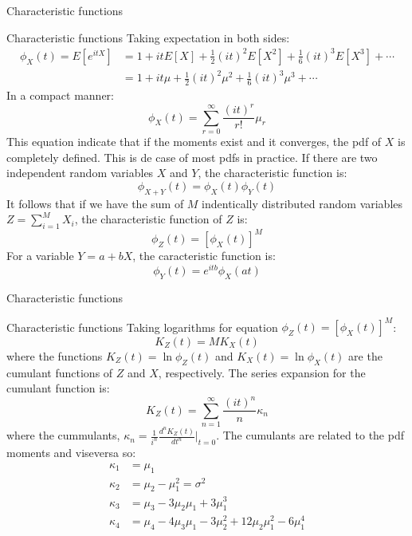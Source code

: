 \documentclass[8pt]{beamer}
\renewcommand{\emph}[1]{\textcolor{myorange}{#1}}
\begin{document}
\begin{frame}{Characteristic functions}
    \begin{block}{Characteristic functions}
        Taking expectation in both sides:
        \begin{align*}
            \phi_X (t) = E[e^{itX}] &= 1 + itE[X] + \frac{1}{2} (it)^2 E[X^2] + \frac{1}{6} (it)^3 E[X^3] + \cdots  \\
                                    &= 1 + it\mu + \frac{1}{2} (it)^2 \mu^2 + \frac{1}{6} (it)^3 \mu^3 + \cdots  
        \end{align*}
    In a compact manner:
    \[
        \phi_X (t) = \sum_{r=0}^{\infty} \frac{(it)^r}{r!} \mu_r
\]
This equation indicate that if the moments exist and it converges, the \emph{pdf} of $X$ is completely defined. This is de case of most \emph{pdf}s in practice. 
If there are two independent random variables $X$ and $Y$, the \emph{characteristic function} is:
    \[
        \phi_{X + Y} (t) = \phi_X (t) \phi_Y (t) 
\]
It follows that if we have the sum of $M$ indentically distributed random variables $Z = \sum_{i=1}^{M} X_i$, the \emph{characteristic function} of $Z$ is:
    \[
        \phi_Z (t) = \left[ \phi_X (t) \right]^M
\]
For a variable $Y = a + bX$, the \emph{caracteristic function} is:
    \[
        \phi_Y (t) = e^{itb} \phi_X (at)
\]
    \end{block}
\end{frame}

\begin{frame}{Characteristic functions}
    \begin{block}{Characteristic functions}
    Taking logarithms for equation $\phi_Z (t) = \left[ \phi_X (t) \right]^M $:
    \[
        K_Z (t) = M K_X (t)
\]
where the functions $K_Z (t) = \ln \phi_Z (t)$ and $K_X (t) = \ln \phi_X (t)$ are the \alert{cumulant functions} of $Z$ and $X$, respectively. The series expansion for the \emph{cumulant function} is: 
    \[
        K_Z (t) = \sum_{n=1}^{\infty} \frac{(it)^n}{n} \kappa_n
\]
where the \alert{cummulants},  $\kappa_n = \frac{1}{i^n} \frac{d^n K_Z (t)}{dt^n} \vert_{t=0}$. The \emph{cumulants} are related to the pdf  moments and viseversa so:
\begin{align*}
    \kappa_1 &= \mu_1 \\
    \kappa_2 &= \mu_2 - \mu_1^2 = \sigma^2 \\
    \kappa_3 &= \mu_3 - 3\mu_2 \mu_1 + 3\mu_1^3 \\
    \kappa_4 &= \mu_4 - 4 \mu_3 \mu_1 - 3\mu_2^2 + 12 \mu_2 \mu_1^2 - 6 \mu_1^4
\end{align*}
    \end{block}
\end{frame}
\end{document}

